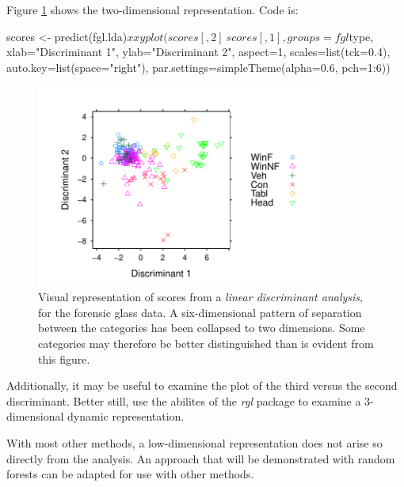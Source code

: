 \documentclass{tufte-book}\usepackage[]{graphicx}\usepackage[]{color}
\begin{document}

Figure \ref{fig:fgl} shows the two-dimensional
representation.  Code is:
\begin{Schunk}
\begin{Sinput}
scores <- predict(fgl.lda)$x
xyplot(scores[,2] ~ scores[,1], groups=fgl$type,
       xlab="Discriminant 1",
       ylab="Discriminant 2",
       aspect=1, scales=list(tck=0.4),
       auto.key=list(space="right"),
       par.settings=simpleTheme(alpha=0.6, pch=1:6))
\end{Sinput}
\end{Schunk}

\begin{figure}
\begin{Schunk}


\centerline{\includegraphics[width=0.85\textwidth]{figs/12-fgl-scores2D-1} }

\end{Schunk}
\caption{Visual representation of scores from a
  {\em linear discriminant analysis}, for the forensic glass data.  A
  six-dimensional pattern of separation between the categories has
  been collapsed to two dimensions.  Some categories may therefore
be better distinguished than is evident from this figure.\label{fig:fgl}}
\end{figure}

Additionally, it may be useful to examine the plot of the third
versus the second discriminant.  Better still, use the abilites of the
\textit{rgl} package to examine a 3-dimensional dynamic representation.

With most other methods, a low-dimensional representation does not
arise so directly from the analysis. An approach that will be
demonstrated with random forests can be adapted for use with
other methods.
\end{document}
